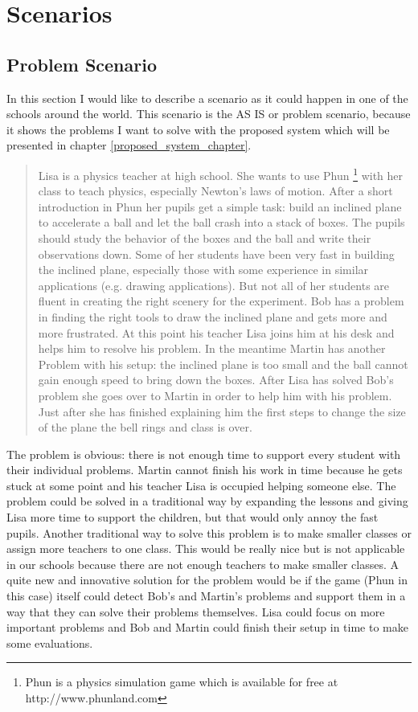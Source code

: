 \chapter{Scenarios}

\section{Problem Scenario}
In this section I would like to describe a scenario as it could happen in one
of the schools around the world. This scenario is the AS IS or problem
scenario, because it shows the problems I want to solve with the proposed
system which will be presented in chapter \ref{proposed_system_chapter}.

\begin{quote}
Lisa is a physics teacher at high school. She wants to use Phun \footnote{Phun
is a physics simulation game which is available for free at
http://www.phunland.com} with
her class to teach physics, especially Newton's laws of motion. After
a short introduction in Phun her pupils get a simple task: build an
inclined plane to accelerate a ball and let the ball crash into a
stack of boxes. The pupils should study the behavior of the boxes
and the ball and write their observations down. Some of her students
have been very fast in building the inclined plane, especially those
with some experience in similar applications (e.g. drawing applications).
But not all of her students are fluent in creating the right scenery
for the experiment. Bob has a problem in finding the right tools to
draw the inclined plane and gets more and more frustrated. At this
point his teacher Lisa joins him at his desk and helps him to resolve
his problem. In the meantime Martin has another Problem with his setup:
the inclined plane is too small and the ball cannot gain enough speed
to bring down the boxes. After Lisa has solved Bob's problem she goes over
to Martin in order to help him with his problem. Just after she has finished explaining
him the first steps to change the size of the plane the bell rings
and class is over.
\end{quote}

The problem is obvious: there is not enough time to support every
student with their individual problems. Martin cannot finish his work
in time because he gets stuck at some point and his teacher Lisa is
occupied helping someone else. The problem could be solved in a traditional
way by expanding the lessons and giving Lisa more time to support the children,
but that would only annoy the fast pupils. Another traditional way to solve this problem is to make smaller
classes or assign more teachers to one class. This would be really nice but is
not applicable in our schools because there are not enough teachers to make
smaller classes. A quite new and innovative solution for the problem would be
if the game (Phun in this case) itself could detect
Bob's and Martin's problems and support them in a way that they can
solve their problems themselves. Lisa could focus on more important
problems and Bob and Martin could finish their setup in time to make
some evaluations. 

